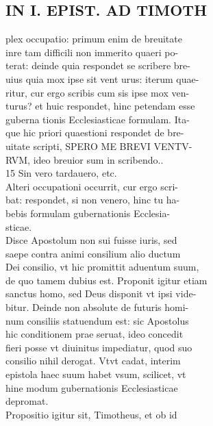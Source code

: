 \documentclass{article}
\begin{document}
\begin{pages}
\section*{IN I. EPIST. AD TIMOTH \\
                }
plex occupatio: primum enim de breuitate \\
                inre tam difficili non immerito quaeri po- \\
                terat: deinde quia respondet se scribere bre- \\
                uius quia mox ipse sit vent urus: iterum quae- \\
                ritur, cur ergo scribis cum sis ipse mox ven- \\
                turus? et huic respondet, hinc petendam esse \\
                guberna tionis Ecclesiasticae formulam. Ita- \\
                que hic priori quaestioni respondet de bre- \\
                uitate scripti, SPERO ME BREVI VENTV- \\
                RVM, ideo breuior sum in scribendo.. \\
                15 Sin vero tardauero, etc. \\
                Alteri occupationi occurrit, cur ergo scri- \\
                bat: respondet, si non venero, hinc tu ha- \\
                bebis formulam gubernationis Ecclesia- \\
                sticae. \\
                Disce Apostolum non sui fuisse iuris, sed \\
                saepe contra animi consilium alio ductum \\
                Dei consilio, vt hic promittit aduentum suum, \\
                de quo tamem dubius est. Proponit igitur etiam \\
                sanctus homo, sed Deus disponit vt ipsi vide- \\
                bitur. Deinde non absolute de futuris homi- \\
                num consiliis statuendum est: sic Apostolus \\
                hic conditionem prae seruat, ideo concedit \\
                fieri posse vt diuinitus impediatur, quod suo \\
                consilio nihil derogat. Vtvt cadat, interim \\
                epistola haec suum habet vsum, scilicet, vt \\
                hine modum gubernationis Ecclesiasticae \\
                depromat. \\
                Propositio igitur sit, Timotheus, et ob id \\
                

\end{pages}
\end{document}
